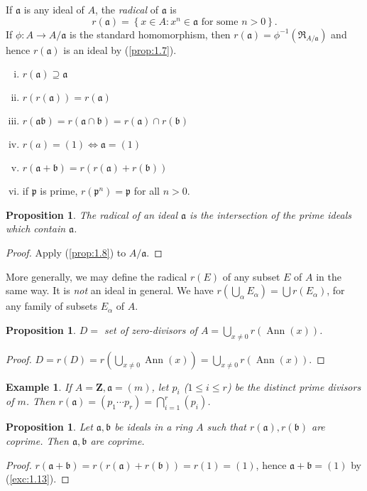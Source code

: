 \documentclass[class=book, crop=false]{standalone}
\newtheorem{proposition}[theorem]{Proposition}
\newtheorem*{example}{Example}
\theoremstyle{definition}
\theoremstyle{remark}
\begin{document}
If $\mathfrak{a}$ is any ideal of $A$, the \textit{radical} of $\mathfrak{a}$ is
\[
  r(\mathfrak{a})=\left\{x \in A: x^{n} \in \mathfrak{a} \text { for some } n>0\right\}.
\]
If $\phi: A \to A / \mathfrak{a}$ is the standard homomorphism, then
$r(\mathfrak{a})=\phi^{-1}\left(\mathfrak{R}_{A / \mathfrak{a}}\right)$ and
hence $r(\mathfrak{a})$ is an ideal by (\ref{prop:1.7}).
\begin{exercise}\label{exc:1.13}
  \begin{enumerate}[i)]
    \item $r(\mathfrak{a}) \supseteq \mathfrak{a}$
    \item $r(r(\mathfrak{a}))=r(\mathfrak{a})$
    \item
          $r(\mathfrak{a} \mathfrak{b})=r(\mathfrak{a} \cap \mathfrak{b})=r(\mathfrak{a}) \cap r(\mathfrak{b})$
    \item $r(a)=(1) \iff \mathfrak{a}=(1)$
    \item $r(\mathfrak{a}+\mathfrak{b})=r(r(\mathfrak{a})+r(\mathfrak{b}))$
    \item if $\mathfrak{p}$ is prime,
          $r\left(\mathfrak{p}^{n}\right)=\mathfrak{p}$ for all $n>0$.
  \end{enumerate}
\end{exercise}
\begin{proposition}\label{prop:1.14}
  The radical of an ideal $\mathfrak{a}$ is the intersection of the prime ideals
  which contain $\mathfrak{a}$.
\end{proposition}
\begin{proof}
  Apply (\ref{prop:1.8}) to $A / \mathfrak{a}$.
\end{proof}

More generally, we may define the radical $r(E)$ of any subset $E$ of $A$ in the
same way. It is \textit{not} an ideal in general. We have
$r\left(\bigcup_{\alpha} E_{\alpha}\right)=\bigcup r\left(E_{\alpha}\right)$,
for any family of subsets $E_{\alpha}$ of $A$.
\begin{proposition}\label{prop:1.15}
  $D=$ set of zero-divisors of $A=\bigcup_{x \neq 0} r(\operatorname{Ann}(x))$.
\end{proposition}
\begin{proof}
  $D=r(D)=r\left(\bigcup_{x \neq 0}\operatorname{Ann}(x)\right)=\bigcup_{x \neq 0} r(\operatorname{Ann}(x))$.
\end{proof}
\begin{example}
  If $A=\mathbf{Z}, \mathfrak{a}=(m)$, let $p_{i}$ ($1 \leq i \leq r$) be the
  distinct prime divisors of $m$. Then
  $r(\mathfrak{a})=\left(p_{1} \cdots p_{r}\right)=\bigcap_{i=1}^{r}\left(p_{i}\right)$.
\end{example}
\begin{proposition}\label{prop:1.16}
  Let $\mathfrak{a}, \mathfrak{b}$ be ideals in a ring $A$ such that
  $r(\mathfrak{a}), r(\mathfrak{b})$ are coprime. Then
  $\mathfrak{a}, \mathfrak{b}$ are coprime.
\end{proposition}
\begin{proof}
  $r(\mathfrak{a}+\mathfrak{b})=r(r(\mathfrak{a})+r(\mathfrak{b}))=r(1)=(1)$,
  hence $\mathfrak{a}+\mathfrak{b}=(1)$ by (\ref{exc:1.13}).
\end{proof}
\end{document}
